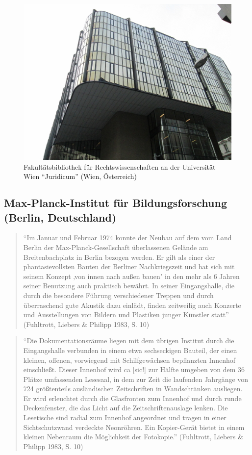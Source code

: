 \documentclass[a4paper,
fontsize=11pt,
oneside,
numbers=noperiodatend,
parskip=half-,
bibliography=totoc,
final
]{scrartcl}
\begin{document}
\begin{figure}[htbp]
\centering
\includegraphics{./img/051.jpg}
\caption{Fakultätsbibliothek für Rechtswissenschaften an der
Universität Wien \enquote{Juridicum} (Wien,
Österreich)}
\end{figure}

\subsection*{Max-Planck-Institut für Bildungsforschung (Berlin,
Deutschland)}\label{max-planck-institut-fuxfcr-bildungsforschung-berlin-deutschland}

\begin{quote}
\enquote{Im Januar und Februar 1974 konnte der Neubau auf dem vom Land
Berlin der Max-Planck-Gesellschaft überlassenen Gelände am
Breitenbachplatz in Berlin bezogen werden. Er gilt als einer der
phantasievollsten Bauten der Berliner Nachkriegszeit und hat sich mit
seinem Konzept ‚von innen nach außen bauen‛ in den mehr als 6 Jahren
seiner Benutzung auch praktisch bewährt. In seiner Eingangshalle, die
durch die besondere Führung verschiedener Treppen und durch überraschend
gute Akustik dazu einlädt, finden zeitweilig auch Konzerte und
Ausstellungen von Bildern und Plastiken junger Künstler statt}
(Fuhltrott, Liebers \& Philipp 1983, S. 10)
\end{quote}

\begin{quote}
\enquote{Die Dokumentationsräume liegen mit dem übrigen Institut durch
die Eingangshalle verbunden in einem etwa sechseckigen Bauteil, der
einen kleinen, offenen, vorwiegend mit Schilfgewächsen bepflanzten
Innenhof einschließt. Dieser Innenhof wird ca {[}sic!{]} zur Hälfte
umgeben von dem 36 Plätze umfassenden Lesesaal, in dem zur Zeit die
laufenden Jahrgänge von 724 größtenteils ausländischen Zeitschriften in
Wandschränken ausliegen. Er wird erleuchtet durch die Glasfronten zum
Innenhof und durch runde Deckenfenster, die das Licht auf die
Zeitschriftenauslage lenken. Die Lesetische sind radial zum Innenhof
angeordnet und tragen in einer Sichtschutzwand verdeckte Neonröhren. Ein
Kopier-Gerät bietet in einem kleinen Nebenraum die Möglichkeit der
Fotokopie.} (Fuhltrott, Liebers \& Philipp 1983, S. 10)
\end{quote}
\end{document}
